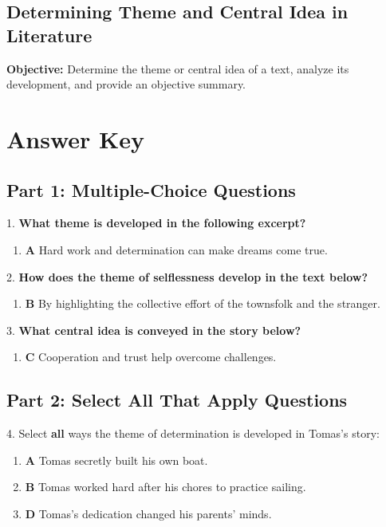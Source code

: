 \documentclass[12pt]{article}
\begin{document}
\subsection*{Determining Theme and Central Idea in Literature}
\onehalfspacing

\begin{tcolorbox}[colframe=black!40, colback=gray!0, title=Learning Objective]
\textbf{Objective:} Determine the theme or central idea of a text, analyze its development, and provide an objective summary.
\end{tcolorbox}

\section*{Answer Key}

\subsection*{Part 1: Multiple-Choice Questions}

1. \textbf{What theme is developed in the following excerpt?}
\begin{enumerate}[label=\Alph*.]
    \item \textbf{A} Hard work and determination can make dreams come true.
\end{enumerate}

2. \textbf{How does the theme of selflessness develop in the text below?}
\begin{enumerate}[label=\Alph*.]
    \item \textbf{B} By highlighting the collective effort of the townsfolk and the stranger.
\end{enumerate}

3. \textbf{What central idea is conveyed in the story below?}
\begin{enumerate}[label=\Alph*.]
    \item \textbf{C} Cooperation and trust help overcome challenges.
\end{enumerate}

\subsection*{Part 2: Select All That Apply Questions}

4. Select \textbf{all} ways the theme of determination is developed in Tomas’s story:
\begin{enumerate}[label=\Alph*.]
    \item \textbf{A} Tomas secretly built his own boat.
    \item \textbf{B} Tomas worked hard after his chores to practice sailing.
    \item \textbf{D} Tomas’s dedication changed his parents’ minds.
\end{enumerate}
\end{document}
